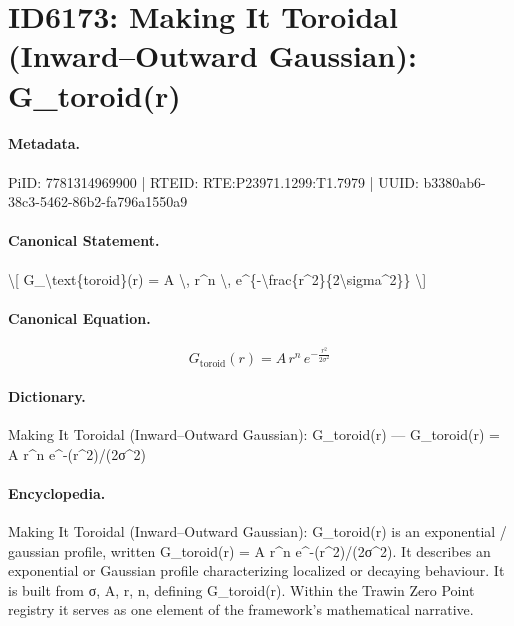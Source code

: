\section*{ID6173: Making It Toroidal (Inward–Outward Gaussian): G\_toroid(r)}
\paragraph{Metadata.}
PiID: 7781314969900 | RTEID: RTE:P23971.1299:T1.7979 | UUID: b3380ab6-38c3-5462-86b2-fa796a1550a9

\paragraph{Canonical Statement.}
\textbackslash{}[ G\_\textbackslash{}text\{toroid\}(r) = A \textbackslash{}, r\textasciicircum{}n \textbackslash{}, e\textasciicircum{}\{-\textbackslash{}frac\{r\textasciicircum{}2\}\{2\textbackslash{}sigma\textasciicircum{}2\}\} \textbackslash{}]

\paragraph{Canonical Equation.}
\[
G_\text{toroid}(r) = A \, r^n \, e^{-\frac{r^2}{2\sigma^2}}
\]

\paragraph{Dictionary.}
Making It Toroidal (Inward–Outward Gaussian): G\_toroid(r) — G\_toroid(r) = A r\textasciicircum{}n e\textasciicircum{}-(r\textasciicircum{}2)/(2σ\textasciicircum{}2)

\paragraph{Encyclopedia.}
Making It Toroidal (Inward–Outward Gaussian): G\_toroid(r) is an exponential / gaussian profile, written G\_toroid(r) = A r\textasciicircum{}n e\textasciicircum{}-(r\textasciicircum{}2)/(2σ\textasciicircum{}2). It describes an exponential or Gaussian profile characterizing localized or decaying behaviour. It is built from σ, A, r, n, defining G\_toroid(r). Within the Trawin Zero Point registry it serves as one element of the framework's mathematical narrative.

